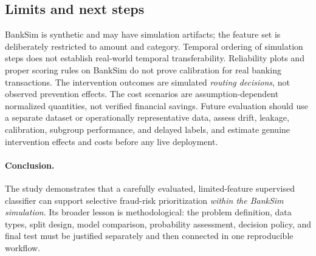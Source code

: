 \documentclass[11pt,a4paper]{article}
\begin{document}
\subsection{Limits and next steps}
BankSim is synthetic and may have simulation artifacts;
the feature set is deliberately restricted to amount and
category. Temporal ordering of simulation steps does not
establish real-world temporal transferability. Reliability
plots and proper scoring rules on BankSim do not prove
calibration for real banking transactions. The intervention
outcomes are simulated \emph{routing decisions}, not
observed prevention effects. The cost scenarios are
assumption-dependent normalized quantities, not verified
financial savings. Future evaluation should use a
separate dataset or operationally representative data,
assess drift, leakage, calibration, subgroup performance,
and delayed labels, and estimate genuine intervention
effects and costs before any live deployment.

\paragraph{Conclusion.}
The study demonstrates that a carefully evaluated,
limited-feature supervised classifier can support
selective fraud-risk prioritization \emph{within the
BankSim simulation}. Its broader lesson is methodological:
the problem definition, data types, split design,
model comparison, probability assessment, decision
policy, and final test must be justified separately
and then connected in one reproducible workflow.
\end{document}
